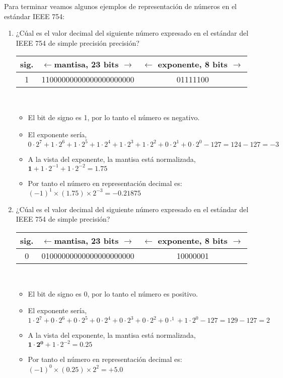 Para terminar veamos algunos ejemplos de representación de números en el estándar IEEE 754:

\begin{enumerate}
\item ¿Cúal es el valor decimal del siguiente número expresado en el estándar del IEEE 754 de simple precisión precisión?

\begin{tabular}{|c||c||c|}
\hline
sig.&$\leftarrow$mantisa, 23 bits $\rightarrow$&$\leftarrow$ exponente, 8 bits $\rightarrow$\\
\hline
1&11000000000000000000000&01111100\\
\hline
\end{tabular}\\

\begin{itemize}
\item El bit de signo es 1, por lo tanto el número es negativo.
\item El exponente sería, $0\cdot2^7+1\cdot2^6+1\cdot2^5+1\cdot2^4+1\cdot2^3+1\cdot2^2+0\cdot2^1+0\cdot2^0-127=124-127=-3$
\item A la vista del exponente, la mantisa está normalizada, $\mathbf{1}+1\cdot2^{-1}+1\cdot2^{-2}=1.75$
\item Por tanto el número en representación decimal es: $ (-1)^1\times(1.75)\times2^{-3}=-0.21875$
\end{itemize}

\item ¿Cúal es el valor decimal del siguiente número expresado en el estándar del IEEE 754 de simple precisión?

\begin{tabular}{|c||c||c|}
\hline
sig.&$\leftarrow$mantisa, 23 bits $\rightarrow$&$\leftarrow$ exponente, 8 bits $\rightarrow$\\
\hline
0&01000000000000000000000&10000001\\
\hline
\end{tabular}\\

\begin{itemize}
\item El bit de signo es 0, por lo tanto el número es positivo.
\item El exponente sería, $1\cdot2^7+0\cdot2^6+0\cdot2^5+0\cdot2^4+0\cdot2^3+0\cdot2^2+0\cdot^1+1\cdot2^0-127=129-127=2$
\item A la vista del exponente, la mantisa está normalizada, $\mathbf{1\cdot 2^0}+1\cdot2^{-2}=0.25$
\item Por tanto el número en representación decimal es: $ (-1)^0\times(0.25)\times2^{2}=+5.0$
\end{itemize}


\end{enumerate}
